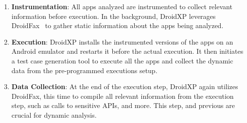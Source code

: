 




\begin{enumerate}[1.]
 \item \textbf{Instrumentation}:  All apps analyzed are instrumented to collect relevant information before execution. In the background, DroidXP leverages DroidFax~\cite{DBLP:conf/icsm/CaiR17a} to gather static information about the apps being analyzed.
 
   
 \item \textbf{Execution}: DroidXP installs the instrumented versions of the apps on an Android emulator and restarts it before the actual execution. It then initiates a test case generation tool to execute all the apps and collect the dynamic data from the pre-programmed executions setup.
  

\item \textbf{Data Collection}: At the end of the execution step, DroidXP again utilizes DroidFax, this time to compile all relevant information from the execution step, such as calls to sensitive APIs, and more. This step, and previous are crucial for dynamic analysis.
\end{enumerate}

